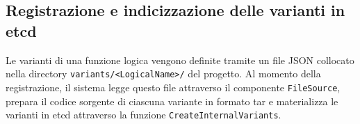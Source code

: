 % 
% 
% 
 
 
\subsection{Registrazione e indicizzazione delle varianti in etcd}
\label{sec:variant-registration}

Le varianti di una funzione logica vengono definite tramite un file
JSON collocato nella directory \texttt{variants/<LogicalName>/} del
progetto. Al momento della registrazione, il sistema legge questo file
attraverso il componente \texttt{FileSource}, prepara il codice sorgente
di ciascuna variante in formato tar e materializza le varianti in etcd
attraverso la funzione \texttt{CreateInternalVariants}.

